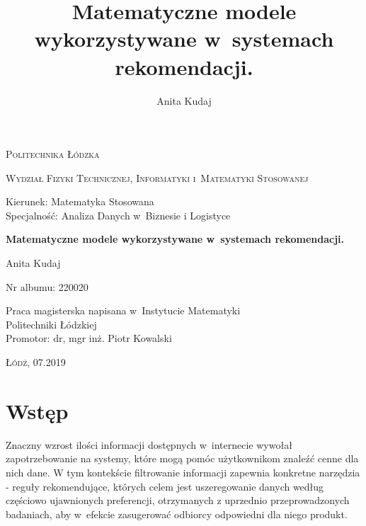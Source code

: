 \documentclass[12pt,a4paper]{report}
\author{Anita Kudaj}
\title{Matematyczne modele wykorzystywane w~systemach rekomendacji.}
\begin{document}
\begin{titlepage}
\begin{flushleft}
\end{flushleft}
\begin{center}
\textsc{{\huge Politechnika Łódzka}}
\end{center}
\bigskip
\bigskip
\begin{center}
\textsc{{\Large Wydział Fizyki Technicznej, Informatyki i~Matematyki Stosowanej}}
\end{center}
\bigskip
\bigskip
\begin{Large}
Kierunek: Matematyka Stosowana
\\Specjalność: Analiza Danych w~Biznesie i Logistyce

\end{Large}
\bigskip
\bigskip
\noindent\hrulefill
\begin{center}
{\textbf{{\Large Matematyczne modele wykorzystywane w~systemach rekomendacji.}}}
\end{center}
\begin{flushright}
{\large 
Anita Kudaj

Nr albumu: 
220020
}
\end{flushright}
\noindent\hrulefill
\bigskip
\bigskip
\begin{center}
{\large Praca magisterska
napisana w~Instytucie Matematyki 
\\Politechniki Łódzkiej 
\bigskip
\bigskip
\\Promotor: dr, mgr inż. Piotr Kowalski
 }
\end{center}
\bigskip
\bigskip
\bigskip
\bigskip
\begin{center}
{\textsc{\large Łódź, 07.2019}}
\end{center}
\end{titlepage}


\tableofcontents


\chapter{Wstęp}
Znaczny wzrost ilości informacji dostępnych w~internecie wywołał zapotrzebowanie na systemy, które mogą pomóc użytkownikom znaleźć cenne dla nich dane. W tym kontekście filtrowanie informacji zapewnia konkretne narzędzia - reguły rekomendujące, których celem jest uszeregowanie danych według częściowo ujawnionych preferencji, otrzymanych z uprzednio przeprowadzonych badaniach, aby w~efekcie zasugerować odbiorcy odpowiedni dla niego produkt. 
\end{document}
